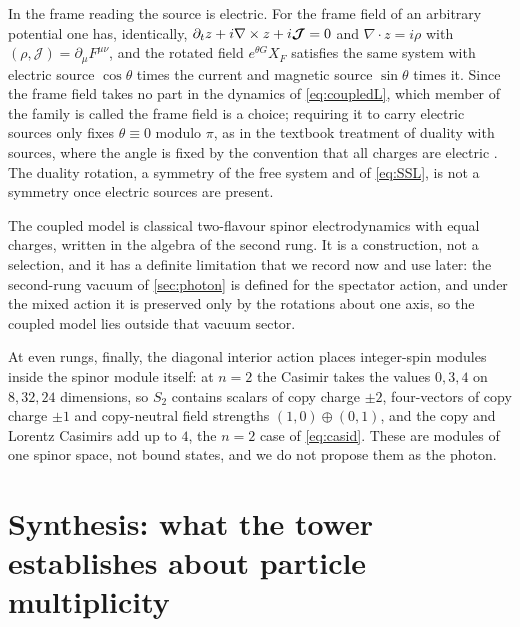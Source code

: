 In the frame reading the source is electric. For the frame field of an arbitrary potential one has, identically,
$\partial_tz+i\nabla\times z+i\boldsymbol{\mathcal J}=0$ and $\nabla\cdot z=i\rho$ with $(\rho,\boldsymbol{\mathcal J})=\partial_\mu F^{\mu\nu}$, and the
rotated field $e^{\theta G}X_F$ satisfies the same system with electric source $\cos\theta$ times the current and magnetic source $\sin\theta$
times it. Since the frame field takes no part in the dynamics of \eqref{eq:coupledL}, which member of the family is called the frame
field is a choice; requiring it to carry electric sources only fixes $\theta\equiv0$ modulo $\pi$, as in the textbook treatment of duality
with sources, where the angle is fixed by the convention that all charges are electric \cite{Jackson}. The duality rotation, a symmetry
of the free system and of \eqref{eq:SSL}, is not a symmetry once electric sources are present.

The coupled model is classical two-flavour spinor electrodynamics with equal charges, written in the algebra of the second rung. It
is a construction, not a selection, and it has a definite limitation that we record now and use later: the second-rung vacuum of
\cref{sec:photon} is defined for the spectator action, and under the mixed action it is preserved only by the rotations about one axis,
so the coupled model lies outside that vacuum sector.

At even rungs, finally, the diagonal interior action places integer-spin modules inside the spinor module itself: at $n=2$ the Casimir
takes the values $0,3,4$ on $8,32,24$ dimensions, so $S_2$ contains scalars of copy charge $\pm2$, four-vectors of copy charge $\pm1$ and
copy-neutral field strengths $(1,0)\oplus(0,1)$, and the copy and Lorentz Casimirs add up to $4$, the $n=2$ case of \eqref{eq:casid}. These
are modules of one spinor space, not bound states, and we do not propose them as the photon.


\section{Synthesis: what the tower establishes about particle multiplicity}
\label{e8:sec:main}

